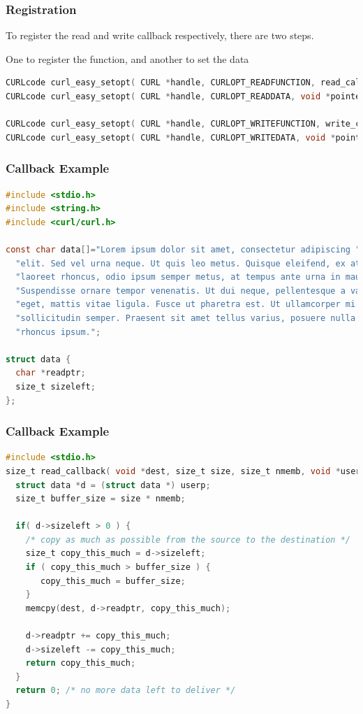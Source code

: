 \begin{frame}[fragile]
\frametitle{Registration}

To register the read and write callback respectively, there are two steps. 

One to register the function, and another to set the data

\begin{lstlisting}[language=C]
CURLcode curl_easy_setopt( CURL *handle, CURLOPT_READFUNCTION, read_callback );
CURLcode curl_easy_setopt( CURL *handle, CURLOPT_READDATA, void *pointer );

CURLcode curl_easy_setopt( CURL *handle, CURLOPT_WRITEFUNCTION, write_callback );
CURLcode curl_easy_setopt( CURL *handle, CURLOPT_WRITEDATA, void *pointer );
\end{lstlisting}

\end{frame}




\begin{frame}[fragile]
\frametitle{Callback Example}

\begin{lstlisting}[language=C]
#include <stdio.h>
#include <string.h>
#include <curl/curl.h>
  
const char data[]="Lorem ipsum dolor sit amet, consectetur adipiscing "
  "elit. Sed vel urna neque. Ut quis leo metus. Quisque eleifend, ex at "
  "laoreet rhoncus, odio ipsum semper metus, at tempus ante urna in mauris. "
  "Suspendisse ornare tempor venenatis. Ut dui neque, pellentesque a varius "
  "eget, mattis vitae ligula. Fusce ut pharetra est. Ut ullamcorper mi ac "
  "sollicitudin semper. Praesent sit amet tellus varius, posuere nulla non, "
  "rhoncus ipsum.";
 
struct data {
  char *readptr;
  size_t sizeleft;
};
\end{lstlisting}
\end{frame}

\begin{frame}[fragile]
\frametitle{Callback Example}

\begin{lstlisting}[language=C]
#include <stdio.h>
size_t read_callback( void *dest, size_t size, size_t nmemb, void *userp ) {
  struct data *d = (struct data *) userp;
  size_t buffer_size = size * nmemb;
 
  if( d->sizeleft > 0 ) {
    /* copy as much as possible from the source to the destination */ 
    size_t copy_this_much = d->sizeleft;
    if ( copy_this_much > buffer_size ) {
       copy_this_much = buffer_size;
    }
    memcpy(dest, d->readptr, copy_this_much);
 
    d->readptr += copy_this_much;
    d->sizeleft -= copy_this_much;
    return copy_this_much; 
  }
  return 0; /* no more data left to deliver */ 
}
\end{lstlisting}

\end{frame}



